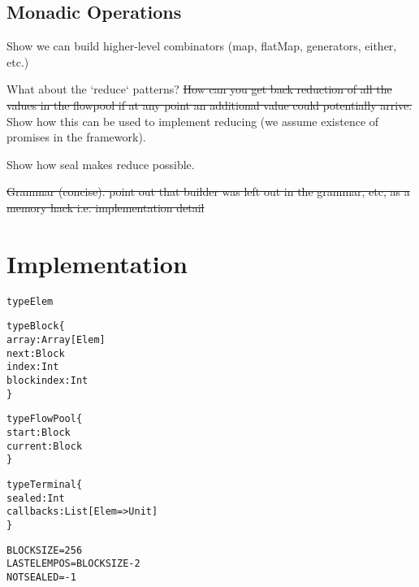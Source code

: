 \documentclass[runningheads,a4paper]{llncs}
\begin{document}
\subsection{Monadic Operations}

Show we can build higher-level combinators (map, flatMap, generators,
either, etc.)

What about the `reduce` patterns? \sout{How can you get back reduction of all
the values in the flowpool if at any point an additional value could
potentially arrive.} Show how this can be used to implement reducing (we
assume existence of promises in the framework).

Show how seal makes reduce possible.

\sout {Grammar (concise). point out that builder was left out in the grammar,
etc, as a memory hack i.e. implementation detail}

\section{Implementation}

\begin{alltt}
{\scriptsize
type Elem

type Block \{
  array: Array[Elem]
  next: Block
  index: Int
  blockindex: Int
\}

type FlowPool \{
  start: Block
  current: Block
\}

type Terminal \{
  sealed: Int
  callbacks: List[Elem => Unit]
\}

BLOCKSIZE = 256
LASTELEMPOS = BLOCKSIZE - 2
NOTSEALED = -1
}
\end{alltt}


\setlength\linenumbersep{2pt}
\end{document}
